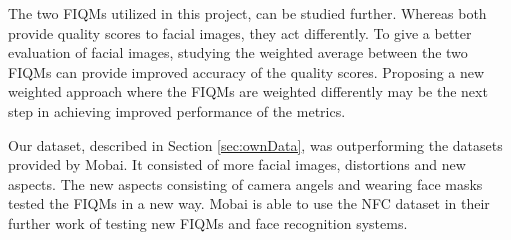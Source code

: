 The two FIQMs utilized in this project, can be studied further. Whereas both provide quality scores to facial images, they act differently. To give a better evaluation of facial images, studying the weighted average between the two FIQMs can provide improved accuracy of the quality scores. Proposing a new weighted approach where the FIQMs are weighted differently may be the next step in achieving improved performance of the metrics.

Our dataset, described in Section \ref{sec:ownData}, was outperforming the datasets provided by Mobai. It consisted of more facial images, distortions and new aspects. The new aspects consisting of camera angels and wearing face masks tested the FIQMs in a new way. Mobai is able to use the NFC dataset in their further work of testing new FIQMs and face recognition systems. 
